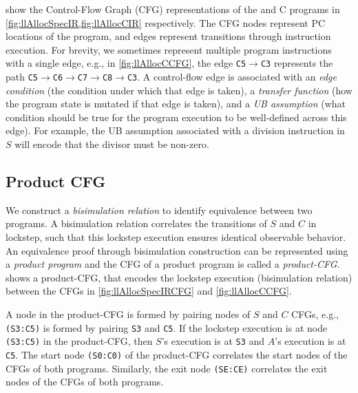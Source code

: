  show the Control-Flow Graph (CFG) representations
of the \SpecL{} and C programs in \cref{fig:llAllocSpecIR,fig:llAllocCIR} respectively.
The CFG nodes represent PC locations of the program, and edges represent
transitions through instruction execution. For brevity, we sometimes represent
multiple program instructions with a single edge, e.g., in \cref{fig:llAllocCCFG}, the edge {\small \tt C5$\rightarrow$C3}
represents the path {\small \tt C5$\rightarrow$C6$\rightarrow$C7$\rightarrow$C8$\rightarrow$C3}. A control-flow edge is associated
with an {\em edge condition} (the condition under which that edge is taken),
a {\em transfer function} (how the program state is mutated if that edge is taken),
and a {\em UB assumption} (what condition should be true for the program
execution to be
well-defined across this edge). For example, the UB assumption associated with a division
instruction in $S$ will encode that the divisor must be non-zero.



\subsection{Product CFG}
\label{sec:productCFG}
We construct
a {\em bisimulation relation} to identify
equivalence between two programs. 
A bisimulation relation correlates
the transitions of $S$ and $C$ in lockstep, such that this
lockstep execution ensures
identical observable behavior.
An equivalence proof through bisimulation construction
can be represented using a
{\em product program} \cite{covac} and the CFG of a product program is called a {\em product-CFG}.
 shows a product-CFG,
that encodes the lockstep execution (bisimulation relation) between the
CFGs in \cref{fig:llAllocSpecIRCFG} and \cref{fig:llAllocCCFG}. 

A node in the product-CFG is formed by pairing nodes
of $S$ and $C$ CFGs, e.g., {\tt (S3:C5)} is formed by
pairing {\tt S3} and {\tt C5}.
If the lockstep
execution is at node {\tt (S3:C5)} in the product-CFG,
then $S$'s execution is at {\tt S3} and $A$'s execution
is at {\tt C5}.
The start node {\tt (S0:C0)} of the product-CFG
correlates the start nodes of the CFGs of both programs.
Similarly, the exit node {\tt (SE:CE)}
correlates the exit nodes of the CFGs of both programs.

